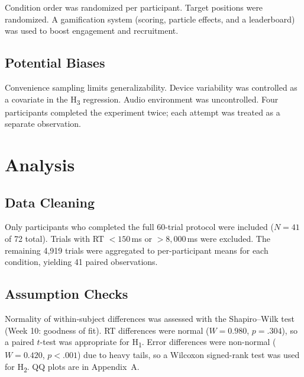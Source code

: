 \documentclass[12pt,letterpaper]{article}
\begin{document}
\vspace{4pt}
\noindent
{}
\vspace{4pt}

Condition order was randomized per participant. Target positions were randomized. A gamification system (scoring, particle effects, and a leaderboard) was used to boost engagement and recruitment.

\subsection{Potential Biases}

Convenience sampling limits generalizability. Device variability was controlled as a covariate in the H\textsubscript{3} regression. Audio environment was uncontrolled. Four participants completed the experiment twice; each attempt was treated as a separate observation.


\section{Analysis}

\subsection{Data Cleaning}

Only participants who completed the full 60-trial protocol were included ($N = 41$ of 72 total). Trials with RT $< 150$\,ms or $> 8{,}000$\,ms were excluded. The remaining 4{,}919 trials were aggregated to per-participant means for each condition, yielding 41 paired observations.

\subsection{Assumption Checks}

Normality of within-subject differences was assessed with the Shapiro--Wilk test (Week 10: goodness of fit). RT differences were normal ($W = 0.980$, $p = .304$), so a paired $t$-test was appropriate for H\textsubscript{1}. Error differences were non-normal ($W = 0.420$, $p < .001$) due to heavy tails, so a Wilcoxon signed-rank test was used for H\textsubscript{2}. QQ plots are in Appendix~A.
\end{document}
